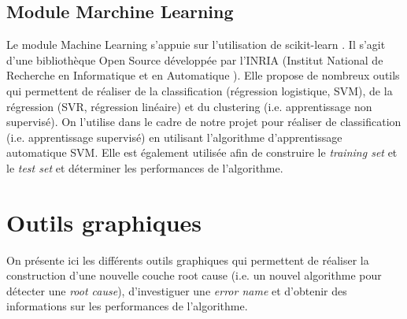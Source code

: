 \subsection{Module Marchine Learning}
\label{Industrialisation du produit:  API: Le module Machine Learning}
Le module Machine Learning s'appuie sur l'utilisation de scikit-learn \cite{ScikitLearn}. Il s'agit d'une bibliothèque Open Source développée par l'INRIA (Institut National de Recherche en Informatique et en Automatique \cite{INRIA}). Elle propose de nombreux outils qui permettent de réaliser de la classification (régression logistique, SVM), de la régression (SVR, régression linéaire) et du clustering (i.e. apprentissage non supervisé). On l'utilise dans le cadre de notre projet pour réaliser de classification (i.e. apprentissage supervisé) en utilisant l'algorithme d'apprentissage automatique SVM. Elle est également utilisée afin de construire le \emph{training set} et le \emph{test set} et déterminer les performances de l'algorithme.




\section{Outils graphiques}
\label{Industrialisation du produit: Outils graphiques}
On présente ici les différents outils graphiques qui permettent de réaliser la construction d'une nouvelle couche root cause (i.e. un nouvel algorithme pour détecter une \emph{root cause}), d'investiguer une \emph{error name} et d'obtenir des informations sur les performances de l'algorithme. 

